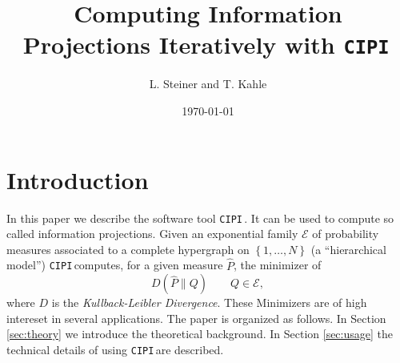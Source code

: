 \documentclass[12pt]{amsart}
\newcommand{\set}[1]{\left\lbrace #1 \right\rbrace} %
\newcommand{\comm}[1]{ }
\newcommand{\cipi}{\texttt{CIPI}\,}
\theoremstyle{plain}%
\theoremstyle{definition}
\theoremstyle{remark}
\begin{document}
\title[CIPI]{Computing Information Projections Iteratively with \cipi}

\author{L. Steiner and T. Kahle}
\address{Max Planck Institute for Mathematics in the Sciences, Inselstrasse 22, D-04103 Leipzig, Germany}

\date{\today}

\comm{
\begin{abstract}
  some abstract\ldots
\end{abstract}
}

\maketitle

\section{Introduction}
In this paper we describe the software tool \cipi. It can be used to compute so
called information projections. Given an exponential family $\mathcal{E}$ of probability
measures associated to a complete hypergraph on $\set{1,\ldots,N}$ (a ``hierarchical model'')
\cipi computes, for a given measure $\hat{P}$, the minimizer of 
\begin{equation*}
  D(\hat{P}\parallel Q) \qquad Q\in\mathcal{E}, 
\end{equation*} where $D$ is the \emph{Kullback-Leibler Divergence}. These
Minimizers are of high intereset in several applications.
The paper is organized as follows. In Section \ref{sec:theory} we introduce the
theoretical background. In Section \ref{sec:usage} the technical details of
using \cipi are described. 
\end{document}
